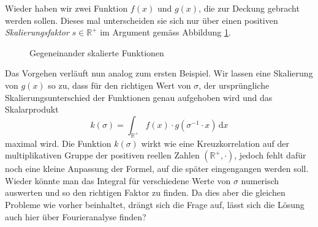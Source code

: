 Wieder haben wir zwei Funktion $f(x)$ und $g(x)$, die zur Deckung gebracht 
werden sollen. Dieses mal unterscheiden sie sich nur 
über einen positiven \emph{Skalierungsfaktor} $s \in \mathbb{R^+}$ im 
Argument gemäss Abbildung \ref{fig:mellin:f2}.
\begin{figure}
    \centering
    \caption{Gegeneinander skalierte Funktionen
    \label{fig:mellin:f2}}
\end{figure}
Das Vorgehen verläuft nun analog zum ersten Beispiel. Wir lassen eine 
Skalierung von $g(x)$ so zu, dass für den richtigen Wert von
$\sigma$, der ursprüngliche Skalierungsunterschied der Funktionen genau 
aufgehoben wird und das Skalarprodukt
\begin{equation}
    k(\sigma) 
    = \int_\mathbb{R^+} f(x) \cdot g(\sigma^{-1} \cdot x)\,\mathrm{d}x
    \label{mellin:ksigma}
\end{equation}
maximal wird.
Die Funktion $k(\sigma)$ wirkt wie eine Kreuzkorrelation auf der 
multiplikativen Gruppe der positiven reellen Zahlen $(\mathbb{R^+},\cdot)$, 
jedoch fehlt dafür noch eine kleine Anpassung der Formel, auf die später 
eingengangen werden soll. 
Wieder könnte man das Integral für verschiedene Werte von $\sigma$ 
numerisch auswerten und so den richtigen Faktor zu finden. 
Da dies aber die gleichen Probleme wie vorher beinhaltet, drängt sich die 
Frage auf, lässt sich die Lösung auch hier über Fourieranalyse finden?